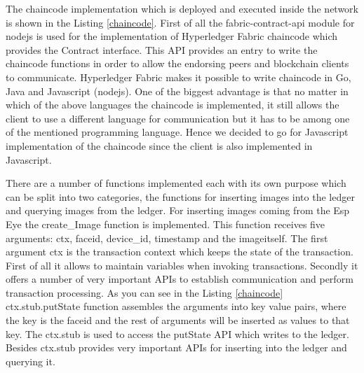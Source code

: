 The chaincode implementation which is deployed and executed inside the network is shown in the Listing \ref{chaincode}. First of all the {\selectfont fabric-contract-api} module for nodejs is used for the implementation of Hyperledger Fabric chaincode which provides the {\selectfont Contract} interface. This API provides an entry to write the chaincode functions in order to allow the endorsing peers and blockchain clients to communicate. Hyperledger Fabric makes it possible to write chaincode in Go, Java and Javascript (nodejs). One of the biggest advantage is that no matter in which of the above languages the chaincode is implemented, it still allows the client to use a different language for communication but it has to be among one of the mentioned programming language. 
Hence we decided to go for Javascript implementation of the chaincode since the client is also implemented in Javascript. 

There are a number of functions implemented each with its own purpose which can be split into two categories, the functions for inserting images into the ledger and querying images from the ledger.  For inserting images coming from the Esp Eye the {\selectfont create\_Image} function is implemented. This function receives five arguments: {\selectfont ctx}, {\selectfont faceid}, {\selectfont device\_id}, {\selectfont timestamp} and the {\selectfont imageitself}.
The first argument {\selectfont ctx} is the transaction context which keeps the state of the transaction. First of all it allows to maintain variables when invoking transactions. Secondly it offers a number of very important APIs to establish communication and perform transaction processing. As you can see in the Listing \ref{chaincode} {\selectfont ctx.stub.putState} function assembles the arguments into key value pairs, where the key is the {\selectfont faceid} and the rest of arguments will be inserted as values to that key. The {\selectfont ctx.stub} is used to access the 
{\selectfont putState} API which writes to the ledger. Besides {\selectfont ctx.stub} provides very important APIs for inserting into the ledger and querying it.  










